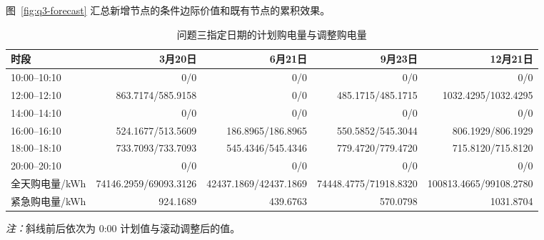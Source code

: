 \documentclass[withoutpreface,bwprint]{cumcmthesis}
\begin{document}
图~\ref{fig:q3-forecast} 汇总新增节点的条件边际价值和既有节点的累积效果。

\begin{table}[H]
  \centering
  \caption{问题三指定日期的计划购电量与调整购电量}
  \label{tab:q3-dates}
  \small
  \setlength{\tabcolsep}{3pt}
  \begin{tabular}{lrrrr}
    \toprule
    时段 & 3月20日 & 6月21日 & 9月23日 & 12月21日 \\
    \midrule
    10:00--10:10 & 0/0 & 0/0 & 0/0 & 0/0 \\
    12:00--12:10 & 863.7174/585.9158 & 0/0 & 485.1715/485.1715 & 1032.4295/1032.4295 \\
    14:00--14:10 & 0/0 & 0/0 & 0/0 & 0/0 \\
    16:00--16:10 & 524.1677/513.5609 & 186.8965/186.8965 & 550.5852/545.3044 & 806.1929/806.1929 \\
    18:00--18:10 & 733.7093/733.7093 & 545.4346/545.4346 & 779.4720/779.4720 & 715.8120/715.8120 \\
    20:00--20:10 & 0/0 & 0/0 & 0/0 & 0/0 \\
    \midrule
    全天购电量/kWh & 74146.2959/69093.3126 & 42437.1869/42437.1869 & 74448.4775/71918.8320 & 100813.4665/99108.2780 \\
    紧急购电量/kWh & 924.1689 & 439.6763 & 570.0798 & 1031.8704 \\
    \bottomrule
  \end{tabular}
  \par\vspace{1.5mm}
  \noindent\begin{minipage}{0.96\textwidth}
    \scriptsize\textit{注：}斜线前后依次为 0:00 计划值与滚动调整后的值。
  \end{minipage}
\end{table}
\end{document}
